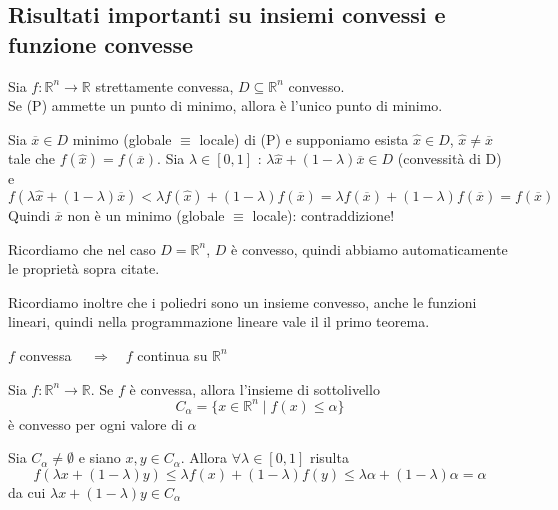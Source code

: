 \subsection{Risultati importanti su insiemi convessi
e funzione convesse}
\begin{theo}
 Sia $f: \mathbb{R}^n \rightarrow \mathbb{R}$ strettamente convessa,
$D \subseteq \mathbb{R}^n$ convesso. \\ Se (P) ammette un punto di
minimo, allora è l'unico punto di minimo.
\end{theo}

\begin{thproof}
 Sia $\overline{x} \in D$ minimo (globale $\equiv$ locale) di 
(P) e supponiamo esista $\hat{x} \in D$, $\hat{x} \neq \overline{x}$
 tale che $f(\hat{x}) = f(\overline{x})$. Sia $\lambda \in [0,1]
$ : $\lambda \hat{x} + (1-\lambda) \overline{x} \in D$
 (convessit\`a di D) e 
$$ f(\lambda \hat{x} + (1-\lambda)\overline{x}) < 
 \lambda f(\hat{x}) + (1-\lambda) f(\overline{x}) = 
 \lambda f(\overline{x}) + (1-\lambda)f(\overline{x}) =
  f(\overline{x})$$
  Quindi $\overline{x}$ non \`e un minimo 
 (globale $\equiv$ locale): contraddizione!
 \end{thproof}

\begin{notes}
 Ricordiamo che nel caso $D=\mathbb{R}^{n}$, $D$ è convesso, quindi abbiamo
automaticamente le proprietà sopra citate.
\end{notes}

\begin{notes}
Ricordiamo inoltre che i poliedri sono un insieme convesso, anche le
funzioni lineari, quindi nella programmazione lineare vale il il primo
teorema.
\end{notes}

\begin{property}
 $f$ convessa $\quad \Longrightarrow \quad f $ continua su
$\mathbb{R}^{n} $
\end{property}

\begin{property}
Sia $f: \mathbb{R}^{n} \rightarrow \mathbb{R}$.  Se $f$ è 
convessa, allora l'insieme di sottolivello
$$ C_{\alpha} = \{  x \in \mathbb{R}^{n} \; | \;  f(x) \leq \alpha \}$$
è convesso per ogni valore di $\alpha$
\end{property}

\begin{thproof}
Sia $C_\alpha \neq \emptyset$ e siano $x,y \in C_{\alpha}$. 
Allora $\forall \lambda \in [0,1]$ risulta
$$ f(\lambda x + (1-\lambda)y) \leq
 \lambda f(x) + (1-\lambda) f(y) \leq \lambda \alpha
 + (1-\lambda) \alpha = \alpha$$
da cui $\lambda x + (1-\lambda)y \in C_{\alpha}$
\end{thproof}

